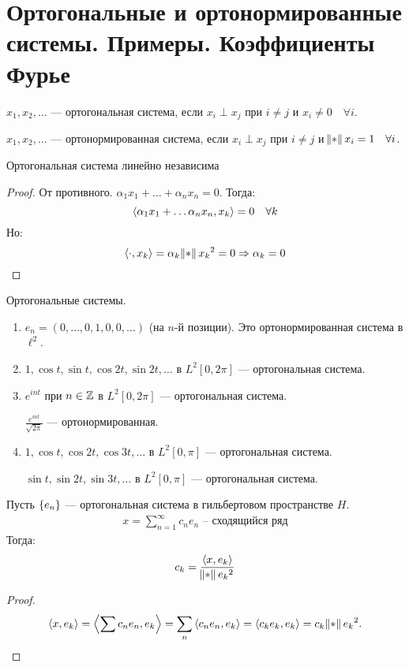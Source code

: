 \section{Ортогональные и ортонормированные системы. Примеры. Коэффициенты Фурье}

\begin{definition}
    $x_1, x_2, \ldots$ --- ортогональная система, если $x_i \perp x_j$ при $i \neq j$ и $x_i \neq 0 \quad \forall i$.
\end{definition}
\begin{definition}
    $x_1, x_2, \ldots$ --- ортонормированная система, если $x_i \perp x_j$ при $i \neq j$ и $\norm{x_i} = 1\quad \forall i$.
\end{definition}

\begin{observation}
    Ортогональная система линейно независима
\end{observation}
\begin{proof}
    От противного. $\alpha_1 x_1 + \ldots + \alpha_n x_n = 0$. Тогда:
    $$\left\langle \alpha_1 x_1 + \ldots \alpha_n x_n, x_k \right\rangle = 0 \quad \forall k$$
    Но: 
    $$\dotprod{\cdot}{x_k} = \alpha_k \norm{x_k}^2 = 0 \Rightarrow \alpha_k = 0$$
\end{proof}

\begin{examples} Ортогональные системы.
    \begin{enumerate}
        \item $e_n = (0, \ldots, 0, 1, 0, 0, \ldots)$ (на $n$-й позиции). Это ортонормированная система в $\ell^2$.
        \item $1, \cos t, \sin t, \cos 2t, \sin 2t, \ldots$ в $L^2[0, 2\pi]$ --- ортогональная система.
        \item $e^{i n t}$ при $n \in \mathbb{Z}$ в $L^2[0, 2\pi]$ --- ортогональная система.

              $\frac{e^{int}}{\sqrt{2\pi}}$ --- ортонормированная.
        \item $1, \cos t, \cos 2t, \cos 3t, \ldots$ в $L^2[0, \pi]$ --- ортогональная система.

              $\sin t, \sin 2t, \sin 3t, \ldots$ в $L^2[0, \pi]$ --- ортогональная система.
    \end{enumerate}
\end{examples}

\begin{theorem}
    Пусть $\set{e_n}$ --- ортогональная система в гильбертовом пространстве $H$.
    \begin{gather*}
        x = \sum\limits_{n=1}^\infty c_n e_n \text{ -- сходящийся ряд}
    \end{gather*}
    Тогда: 
    $$c_k = \dfrac{\dotprod{x}{e_k}}{\norm{e_k}^2}$$
\end{theorem}
\begin{proof}
    \[
        \dotprod{x}{e_k} = \dotprod{\sum c_n e_n}{e_k} = \sum\limits_n \dotprod{c_n e_n}{e_k} = \dotprod{c_k e_k}{e_k} = c_k \norm{e_k}^2
        .\]
\end{proof}


